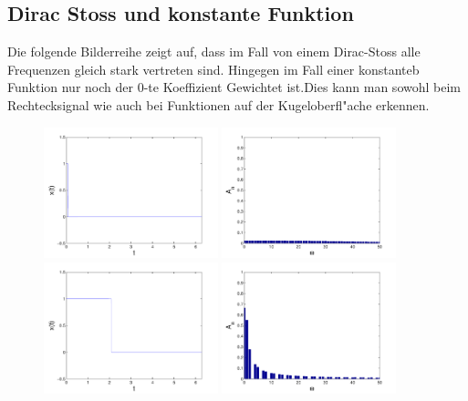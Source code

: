 \begin{refsection}
\section{Dirac Stoss und konstante Funktion}

Die folgende Bilderreihe zeigt auf, dass im Fall von einem Dirac-Stoss
alle Frequenzen gleich stark vertreten sind. 
Hingegen im Fall einer konstanteb Funktion nur noch der 0-te 
Koeffizient Gewichtet ist.Dies kann man sowohl beim Rechtecksignal 
wie auch bei Funktionen auf der Kugeloberfl"ache erkennen.

\begin{figure}
\centering
\includegraphics[width=0.45\textwidth]{kugel/Dkonstant/Rechteck1_1.pdf}
\includegraphics[width=0.45\textwidth]{kugel/Dkonstant/Rechteck1_2.pdf}
\includegraphics[width=0.45\textwidth]{kugel/Dkonstant/Rechteck2_1.pdf}
\includegraphics[width=0.45\textwidth]{kugel/Dkonstant/Rechteck2_2.pdf}

\end{figure}
\end{refsection}
